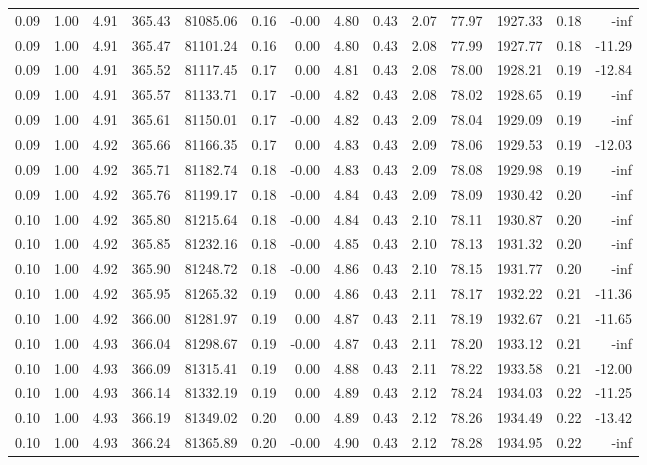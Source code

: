 \begin{table}[!ht]
\begin{tabular}{rrrrrrrrrrrrrr}
0.09 & 1.00 & 4.91 & 365.43 & 81085.06 & 0.16 & -0.00 & 4.80 & 0.43 & 2.07 & 77.97 & 1927.33 & 0.18 & -inf \\
0.09 & 1.00 & 4.91 & 365.47 & 81101.24 & 0.16 & 0.00 & 4.80 & 0.43 & 2.08 & 77.99 & 1927.77 & 0.18 & -11.29 \\
0.09 & 1.00 & 4.91 & 365.52 & 81117.45 & 0.17 & 0.00 & 4.81 & 0.43 & 2.08 & 78.00 & 1928.21 & 0.19 & -12.84 \\
0.09 & 1.00 & 4.91 & 365.57 & 81133.71 & 0.17 & -0.00 & 4.82 & 0.43 & 2.08 & 78.02 & 1928.65 & 0.19 & -inf \\
0.09 & 1.00 & 4.91 & 365.61 & 81150.01 & 0.17 & -0.00 & 4.82 & 0.43 & 2.09 & 78.04 & 1929.09 & 0.19 & -inf \\
0.09 & 1.00 & 4.92 & 365.66 & 81166.35 & 0.17 & 0.00 & 4.83 & 0.43 & 2.09 & 78.06 & 1929.53 & 0.19 & -12.03 \\
0.09 & 1.00 & 4.92 & 365.71 & 81182.74 & 0.18 & -0.00 & 4.83 & 0.43 & 2.09 & 78.08 & 1929.98 & 0.19 & -inf \\
0.09 & 1.00 & 4.92 & 365.76 & 81199.17 & 0.18 & -0.00 & 4.84 & 0.43 & 2.09 & 78.09 & 1930.42 & 0.20 & -inf \\
0.10 & 1.00 & 4.92 & 365.80 & 81215.64 & 0.18 & -0.00 & 4.84 & 0.43 & 2.10 & 78.11 & 1930.87 & 0.20 & -inf \\
0.10 & 1.00 & 4.92 & 365.85 & 81232.16 & 0.18 & -0.00 & 4.85 & 0.43 & 2.10 & 78.13 & 1931.32 & 0.20 & -inf \\
0.10 & 1.00 & 4.92 & 365.90 & 81248.72 & 0.18 & -0.00 & 4.86 & 0.43 & 2.10 & 78.15 & 1931.77 & 0.20 & -inf \\
0.10 & 1.00 & 4.92 & 365.95 & 81265.32 & 0.19 & 0.00 & 4.86 & 0.43 & 2.11 & 78.17 & 1932.22 & 0.21 & -11.36 \\
0.10 & 1.00 & 4.92 & 366.00 & 81281.97 & 0.19 & 0.00 & 4.87 & 0.43 & 2.11 & 78.19 & 1932.67 & 0.21 & -11.65 \\
0.10 & 1.00 & 4.93 & 366.04 & 81298.67 & 0.19 & -0.00 & 4.87 & 0.43 & 2.11 & 78.20 & 1933.12 & 0.21 & -inf \\
0.10 & 1.00 & 4.93 & 366.09 & 81315.41 & 0.19 & 0.00 & 4.88 & 0.43 & 2.11 & 78.22 & 1933.58 & 0.21 & -12.00 \\
0.10 & 1.00 & 4.93 & 366.14 & 81332.19 & 0.19 & 0.00 & 4.89 & 0.43 & 2.12 & 78.24 & 1934.03 & 0.22 & -11.25 \\
0.10 & 1.00 & 4.93 & 366.19 & 81349.02 & 0.20 & 0.00 & 4.89 & 0.43 & 2.12 & 78.26 & 1934.49 & 0.22 & -13.42 \\
0.10 & 1.00 & 4.93 & 366.24 & 81365.89 & 0.20 & -0.00 & 4.90 & 0.43 & 2.12 & 78.28 & 1934.95 & 0.22 & -inf \\

\end{tabular}
\end{table}
